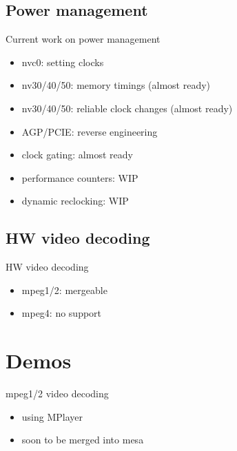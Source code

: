 \documentclass[11pt,english,compress]{beamer}
\begin{document}
	\subsection{Power management}
		\begin{frame}
			\begin{block}{Current work on power management}
				\begin{itemize}
					\item nvc0: setting clocks
					\item nv30/40/50: memory timings (almost ready)
					\item nv30/40/50: reliable clock changes (almost ready)
					\item AGP/PCIE: reverse engineering
					\item clock gating: almost ready
					\item performance counters: WIP
					\item dynamic reclocking: WIP
				\end{itemize}
			\end{block}
		\end{frame}

	\subsection{HW video decoding}
		\begin{frame}
			\begin{block}{HW video decoding}
				\begin{itemize}
					\item mpeg1/2: mergeable
					\item mpeg4: no support
				\end{itemize}
			\end{block}
		\end{frame}

\section{Demos}
	\begin{frame}
		\begin{block}{mpeg1/2 video decoding}
			\begin{itemize}
				\item using MPlayer
				\item soon to be merged into mesa
			\end{itemize}
		\end{block}
	\end{frame}
\end{document}
